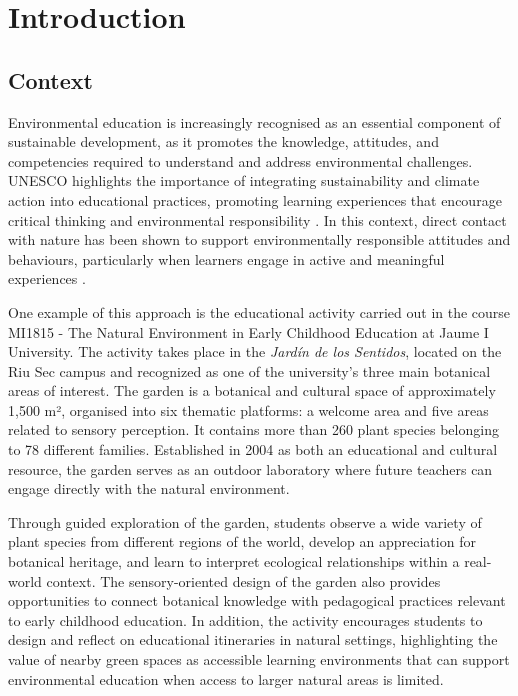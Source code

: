 \chapter{Introduction}

\section{Context}
Environmental education is increasingly recognised as an essential component of sustainable development, as it promotes the knowledge, attitudes, and competencies required to understand and address environmental challenges. UNESCO highlights the importance of integrating sustainability and climate action into educational practices, promoting learning experiences that encourage critical thinking and environmental responsibility \cite{unesco_2024}. In this context, direct contact with nature has been shown to support environmentally responsible attitudes and behaviours, particularly when learners engage in active and meaningful experiences \cite{rosa2018nature}.

One example of this approach is the educational activity carried out in the course MI1815 - The Natural Environment in Early Childhood Education at Jaume I University. The activity takes place in the \textit{Jardín de los Sentidos}, located on the Riu Sec campus and recognized as one of the university’s three main botanical areas of interest. The garden is a botanical and cultural space of approximately 1,500 m², organised into six thematic platforms: a welcome area and five areas related to sensory perception. It contains more than 260 plant species belonging to 78 different families. Established in 2004 as both an educational and cultural resource, the garden serves as an outdoor laboratory where future teachers can engage directly with the natural environment.

Through guided exploration of the garden, students observe a wide variety of plant species from different regions of the world, develop an appreciation for botanical heritage, and learn to interpret ecological relationships within a real-world context. The sensory-oriented design of the garden also provides opportunities to connect botanical knowledge with pedagogical practices relevant to early childhood education. In addition, the activity encourages students to design and reflect on educational itineraries in natural settings, highlighting the value of nearby green spaces as accessible learning environments that can support environmental education when access to larger natural areas is limited.


